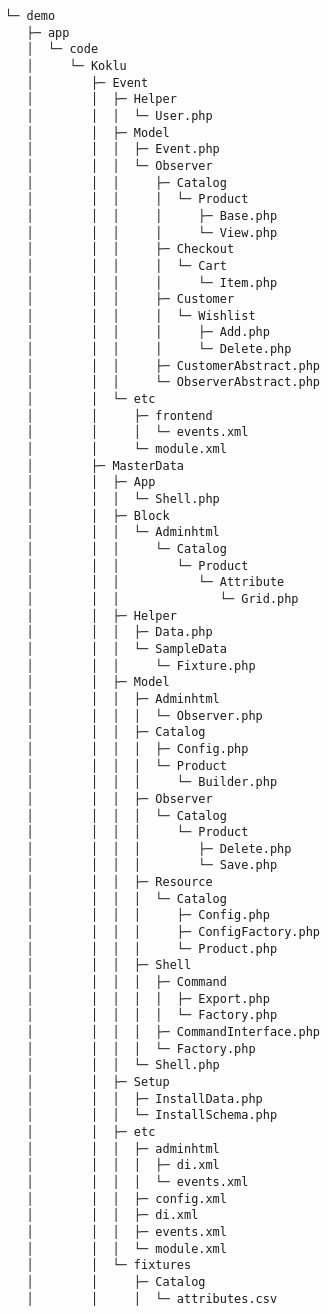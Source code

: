 \begin{codebox}
\begin{verbatim}
└─ demo
   ├─ app
   │  └─ code
   │     └─ Koklu
   │        ├─ Event
   │        │  ├─ Helper
   │        │  │  └─ User.php
   │        │  ├─ Model
   │        │  │  ├─ Event.php
   │        │  │  └─ Observer
   │        │  │     ├─ Catalog
   │        │  │     │  └─ Product
   │        │  │     │     ├─ Base.php
   │        │  │     │     └─ View.php
   │        │  │     ├─ Checkout
   │        │  │     │  └─ Cart
   │        │  │     │     └─ Item.php
   │        │  │     ├─ Customer
   │        │  │     │  └─ Wishlist
   │        │  │     │     ├─ Add.php
   │        │  │     │     └─ Delete.php
   │        │  │     ├─ CustomerAbstract.php
   │        │  │     └─ ObserverAbstract.php
   │        │  └─ etc
   │        │     ├─ frontend
   │        │     │  └─ events.xml
   │        │     └─ module.xml
   │        ├─ MasterData
   │        │  ├─ App
   │        │  │  └─ Shell.php
   │        │  ├─ Block
   │        │  │  └─ Adminhtml
   │        │  │     └─ Catalog
   │        │  │        └─ Product
   │        │  │           └─ Attribute
   │        │  │              └─ Grid.php
   │        │  ├─ Helper
   │        │  │  ├─ Data.php
   │        │  │  └─ SampleData
   │        │  │     └─ Fixture.php
   │        │  ├─ Model
   │        │  │  ├─ Adminhtml
   │        │  │  │  └─ Observer.php
   │        │  │  ├─ Catalog
   │        │  │  │  ├─ Config.php
   │        │  │  │  └─ Product
   │        │  │  │     └─ Builder.php
   │        │  │  ├─ Observer
   │        │  │  │  └─ Catalog
   │        │  │  │     └─ Product
   │        │  │  │        ├─ Delete.php
   │        │  │  │        └─ Save.php
   │        │  │  ├─ Resource
   │        │  │  │  └─ Catalog
   │        │  │  │     ├─ Config.php
   │        │  │  │     ├─ ConfigFactory.php
   │        │  │  │     └─ Product.php
   │        │  │  ├─ Shell
   │        │  │  │  ├─ Command
   │        │  │  │  │  ├─ Export.php
   │        │  │  │  │  └─ Factory.php
   │        │  │  │  ├─ CommandInterface.php
   │        │  │  │  └─ Factory.php
   │        │  │  └─ Shell.php
   │        │  ├─ Setup
   │        │  │  ├─ InstallData.php
   │        │  │  └─ InstallSchema.php
   │        │  ├─ etc
   │        │  │  ├─ adminhtml
   │        │  │  │  ├─ di.xml
   │        │  │  │  └─ events.xml
   │        │  │  ├─ config.xml
   │        │  │  ├─ di.xml
   │        │  │  ├─ events.xml
   │        │  │  └─ module.xml
   │        │  └─ fixtures
   │        │     ├─ Catalog
   │        │     │  └─ attributes.csv

\end{verbatim}
\end{codebox}
